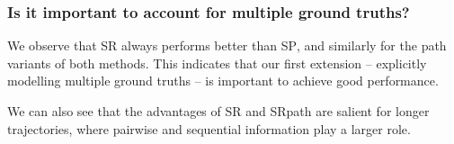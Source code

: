 \subsubsection{Is it important to account for multiple ground truths?}
We observe that \textsc{SR} always performs better than \textsc{SP},
and similarly for the {\sc path} variants of both methods.
This indicates that our first extension -- explicitly modelling multiple ground truths
 -- is important to achieve good performance.

We can also see that the advantages of {\sc SR} %
and {\sc SRpath} are salient for longer trajectories, where pairwise and sequential information play a larger role.



